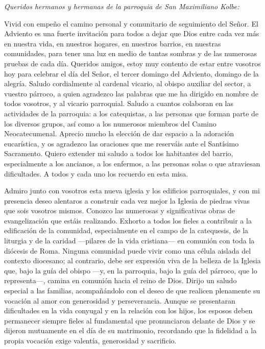 				\begin{body}
					\emph{Queridos hermanos y hermanas de la parroquia de San Maximiliano Kolbe:}
					
					Vivid con empeño el camino personal y comunitario de seguimiento del Señor. El Adviento es una fuerte invitación para todos a dejar que Dios entre cada vez más en nuestra vida, en nuestros hogares, en nuestros barrios, en nuestras comunidades, para tener una luz en medio de tantas sombras y de las numerosas pruebas de cada día. Queridos amigos, estoy muy contento de estar entre vosotros hoy para celebrar el día del Señor, el tercer domingo del Adviento, domingo de la alegría. Saludo cordialmente al cardenal vicario, al obispo auxiliar del sector, a vuestro párroco, a quien agradezco las palabras que me ha dirigido en nombre de todos vosotros, y al vicario parroquial. Saludo a cuantos colaboran en las actividades de la parroquia: a los catequistas, a las personas que forman parte de los diversos grupos, así como a los numerosos miembros del Camino Neocatecumenal. Aprecio mucho la elección de dar espacio a la adoración eucarística, y os agradezco las oraciones que me reserváis ante el Santísimo Sacramento. Quiero extender mi saludo a todos los habitantes del barrio, especialmente a los ancianos, a los enfermos, a las personas solas o que atraviesan dificultades. A todos y cada uno los recuerdo en esta misa.
					
					Admiro junto con vosotros esta nueva iglesia y los edificios parroquiales, y con mi presencia deseo alentaros a construir cada vez mejor la Iglesia de piedras vivas que sois vosotros mismos. Conozco las numerosas y significativas obras de evangelización que estáis realizando. Exhorto a todos los fieles a contribuir a la edificación de la comunidad, especialmente en el campo de la catequesis, de la liturgia y de la caridad ---pilares de la vida cristiana--- en comunión con toda la diócesis de Roma. Ninguna comunidad puede vivir como una célula aislada del contexto diocesano; al contrario, debe ser expresión viva de la belleza de la Iglesia que, bajo la guía del obispo ---y, en la parroquia, bajo la guía del párroco, que lo representa---, camina en comunión hacia el reino de Dios. Dirijo un saludo especial a las familias, acompañándolo con el deseo de que realicen plenamente su vocación al amor con generosidad y perseverancia. Aunque se presentaran dificultades en la vida conyugal y en la relación con los hijos, los esposos deben permanecer siempre fieles al fundamental  que pronunciaron delante de Dios y se dijeron mutuamente en el día de su matrimonio, recordando que la fidelidad a la propia vocación exige valentía, generosidad y sacrificio.
					

\end{body}
